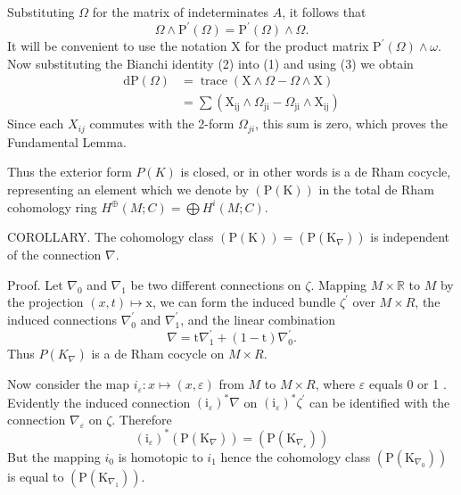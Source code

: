 \documentclass[10pt]{article}
\begin{document}
Substituting $\Omega$ for the matrix of indeterminates $A$, it follows that
$$
\Omega \wedge \mathrm{P}^{\prime}(\Omega)=\mathrm{P}^{\prime}(\Omega) \wedge \Omega .
$$
It will be convenient to use the notation $\mathrm{X}$ for the product matrix $\mathrm{P}^{\prime}(\Omega) \wedge \omega$. Now substituting the Bianchi identity (2) into (1) and using (3) we obtain
$$
\begin{aligned}
\mathrm{dP}(\Omega) &=\operatorname{trace}(\mathrm{X} \wedge \Omega-\Omega \wedge \mathrm{X}) \\
&=\sum\left(\mathrm{X}_{\mathrm{ij}} \wedge \Omega_{\mathrm{ji}}-\Omega_{\mathrm{ji}} \wedge \mathrm{X}_{\mathrm{ij}}\right)
\end{aligned}
$$
Since each $X_{i j}$ commutes with the 2-form $\Omega_{j i}$, this sum is zero, which proves the Fundamental Lemma.

Thus the exterior form $P(K)$ is closed, or in other words is a de Rham cocycle, representing an element which we denote by $(\mathrm{P}(\mathrm{K}))$ in the total de Rham cohomology ring $H^{\oplus}(M ; C)=\bigoplus H^{i}(M ; C)$.

COROLLARY. The cohomology class $(\mathrm{P}(\mathrm{K}))=\left(\mathrm{P}\left(\mathrm{K}_{\nabla}\right)\right)$ is independent of the connection $\nabla$.

Proof. Let $\nabla_{0}$ and $\nabla_{1}$ be two different connections on $\zeta$. Mapping $M \times \mathbb{R}$ to $M$ by the projection $(x, t) \mapsto \mathrm{x}$, we can form the induced bundle $\zeta^{\prime}$ over $M \times R$, the induced connections $\nabla_{0}^{\prime}$ and $\nabla_{1}^{\prime}$, and the linear combination
$$
\nabla=\mathrm{t} \nabla_{1}^{\prime}+(1-\mathrm{t}) \nabla_{0}^{\prime} .
$$
Thus $P\left(K_{\nabla}\right)$ is a de Rham cocycle on $M \times R$.

Now consider the map $i_{\varepsilon}: x \mapsto(x, \varepsilon)$ from $M$ to $M \times R$, where $\varepsilon$ equals 0 or 1 . Evidently the induced connection $\left(\mathrm{i}_{\varepsilon}\right)^{*} \nabla$ on $\left(\mathrm{i}_{\varepsilon}\right)^{*} \zeta^{\prime}$ can be identified with the connection $\nabla_{\varepsilon}$ on $\zeta$. Therefore
$$
\left(\mathrm{i}_{\varepsilon}\right)^{*}\left(\mathrm{P}\left(\mathrm{K}_{\nabla}\right)\right)=\left(\mathrm{P}\left(\mathrm{K}_{\nabla_{\varepsilon}}\right)\right)
$$
But the mapping $i_{0}$ is homotopic to $i_{1}$ hence the cohomology class $\left(\mathrm{P}\left(\mathrm{K}_{\nabla_{0}}\right)\right)$ is equal to $\left(\mathrm{P}\left(\mathrm{K}_{\nabla_{1}}\right)\right)$.
\end{document}
